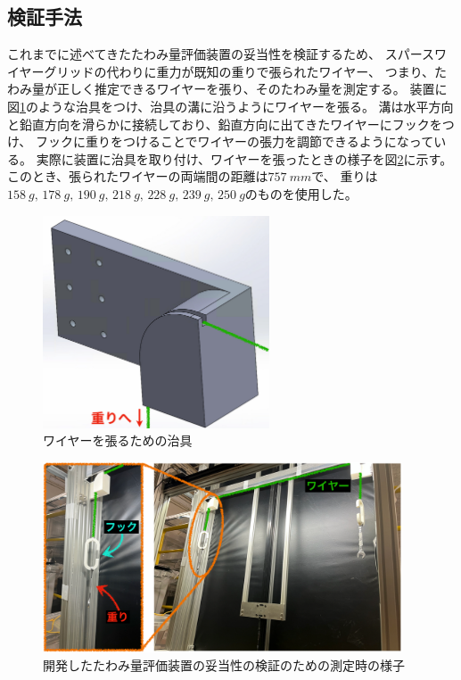 \documentclass[../../main.tex]{subfiles}
\begin{document}
\subsection{検証手法}
これまでに述べてきたたわみ量評価装置の妥当性を検証するため、
スパースワイヤーグリッドの代わりに重力が既知の重りで張られたワイヤー、
つまり、たわみ量が正しく推定できるワイヤーを張り、そのたわみ量を測定する。
装置に図\ref{fig:wiresag_performance_zig}のような治具をつけ、治具の溝に沿うようにワイヤーを張る。
溝は水平方向と鉛直方向を滑らかに接続しており、鉛直方向に出てきたワイヤーにフックをつけ、
フックに重りをつけることでワイヤーの張力を調節できるようになっている。
実際に装置に治具を取り付け、ワイヤーを張ったときの様子を図\ref{fig:wiresag_performance_cehck_system}に示す。
このとき、張られたワイヤーの両端間の距離は$\SI{757}{mm}$で、
重りは$\SI{158}{g},\,\SI{178}{g},\,\SI{190}{g},\,\SI{218}{g},\,\SI{228}{g},\,\SI{239}{g},\,\SI{250}{g}$のものを使用した。
\begin{figure}[H]
    \centering
    \includegraphics[width=0.6\textwidth]{wiresag/wiresag_performance_zig.pdf}
    \caption{ワイヤーを張るための治具}
    \label{fig:wiresag_performance_zig}
\end{figure}
\begin{figure}[H]
    \centering
    \includegraphics[width=0.95\textwidth]{wiresag/wiresag_performance_check_system.pdf}
    \caption{開発したたわみ量評価装置の妥当性の検証のための測定時の様子}
    \label{fig:wiresag_performance_cehck_system}
\end{figure}
\end{document}
